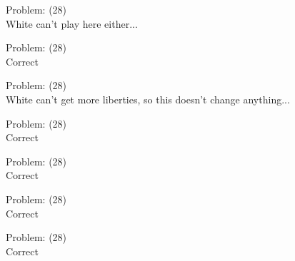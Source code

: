 \documentclass[11pt]{article}
\begin{document}
\begin{minipage}[t]{0.5\textwidth}
  {\centering
  
  Problem: (28)\\
  White can't play here either...\\
  }
\end{minipage}
\begin{minipage}[t]{0.5\textwidth}
  {\centering
  
  Problem: (28)\\
  Correct\\
  }
\end{minipage}
\begin{minipage}[t]{0.5\textwidth}
  {\centering
  
  Problem: (28)\\
  White can't get more liberties, so this doesn't change anything...\\
  }
\end{minipage}
\begin{minipage}[t]{0.5\textwidth}
  {\centering
  
  Problem: (28)\\
  Correct\\
  }
\end{minipage}
\begin{minipage}[t]{0.5\textwidth}
  {\centering
  
  Problem: (28)\\
  Correct\\
  }
\end{minipage}
\begin{minipage}[t]{0.5\textwidth}
  {\centering
  
  Problem: (28)\\
  Correct\\
  }
\end{minipage}
\begin{minipage}[t]{0.5\textwidth}
  {\centering
  
  Problem: (28)\\
  Correct\\
  }
\end{minipage}
\end{document}
